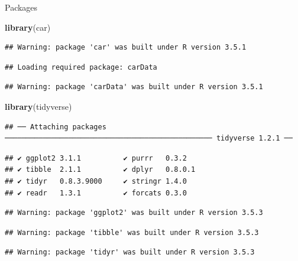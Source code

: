 \documentclass[ignorenonframetext,]{beamer}
\newenvironment{Shaded}{\begin{snugshade}}{\end{snugshade}}
\newcommand{\KeywordTok}[1]{\textcolor[rgb]{0.13,0.29,0.53}{\textbf{#1}}}
\newcommand{\NormalTok}[1]{#1}
\begin{document}
\begin{frame}[fragile]{Packages}
\protect\hypertarget{packages-5}{}

\begin{Shaded}
\begin{Highlighting}[]
\KeywordTok{library}\NormalTok{(car)}
\end{Highlighting}
\end{Shaded}

\begin{verbatim}
## Warning: package 'car' was built under R version 3.5.1
\end{verbatim}

\begin{verbatim}
## Loading required package: carData
\end{verbatim}

\begin{verbatim}
## Warning: package 'carData' was built under R version 3.5.1
\end{verbatim}

\begin{Shaded}
\begin{Highlighting}[]
\KeywordTok{library}\NormalTok{(tidyverse)}
\end{Highlighting}
\end{Shaded}

\begin{verbatim}
## ── Attaching packages ───────────────────────────────────────────────── tidyverse 1.2.1 ──
\end{verbatim}

\begin{verbatim}
## ✔ ggplot2 3.1.1          ✔ purrr   0.3.2     
## ✔ tibble  2.1.1          ✔ dplyr   0.8.0.1   
## ✔ tidyr   0.8.3.9000     ✔ stringr 1.4.0     
## ✔ readr   1.3.1          ✔ forcats 0.3.0
\end{verbatim}

\begin{verbatim}
## Warning: package 'ggplot2' was built under R version 3.5.3
\end{verbatim}

\begin{verbatim}
## Warning: package 'tibble' was built under R version 3.5.3
\end{verbatim}

\begin{verbatim}
## Warning: package 'tidyr' was built under R version 3.5.3
\end{verbatim}


\end{frame}
\end{document}
